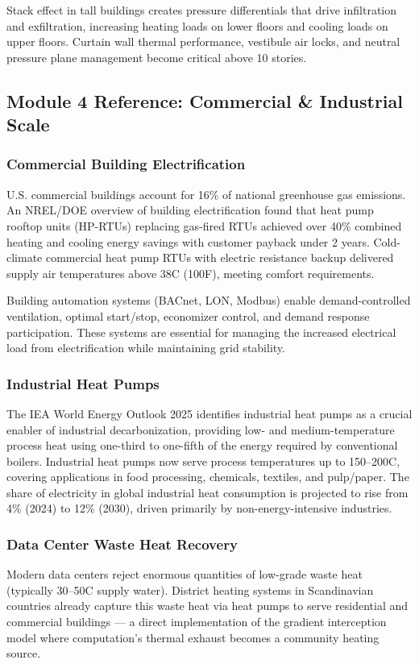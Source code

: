\documentclass[11pt,letterpaper]{article}
\begin{document}
Stack effect in tall buildings creates pressure differentials that drive infiltration and exfiltration, increasing heating loads on lower floors and cooling loads on upper floors. Curtain wall thermal performance, vestibule air locks, and neutral pressure plane management become critical above 10 stories.

\subsection{Module 4 Reference: Commercial \& Industrial Scale}

\subsubsection{Commercial Building Electrification}
U.S. commercial buildings account for 16\% of national greenhouse gas emissions. An NREL/DOE overview of building electrification found that heat pump rooftop units (HP-RTUs) replacing gas-fired RTUs achieved over 40\% combined heating and cooling energy savings with customer payback under 2 years. Cold-climate commercial heat pump RTUs with electric resistance backup delivered supply air temperatures above 38\textdegree C (100\textdegree F), meeting comfort requirements.

Building automation systems (BACnet, LON, Modbus) enable demand-controlled ventilation, optimal start/stop, economizer control, and demand response participation. These systems are essential for managing the increased electrical load from electrification while maintaining grid stability.

\subsubsection{Industrial Heat Pumps}
The IEA World Energy Outlook 2025 identifies industrial heat pumps as a crucial enabler of industrial decarbonization, providing low- and medium-temperature process heat using one-third to one-fifth of the energy required by conventional boilers. Industrial heat pumps now serve process temperatures up to 150--200\textdegree C, covering applications in food processing, chemicals, textiles, and pulp/paper. The share of electricity in global industrial heat consumption is projected to rise from 4\% (2024) to 12\% (2030), driven primarily by non-energy-intensive industries.

\subsubsection{Data Center Waste Heat Recovery}
Modern data centers reject enormous quantities of low-grade waste heat (typically 30--50\textdegree C supply water). District heating systems in Scandinavian countries already capture this waste heat via heat pumps to serve residential and commercial buildings --- a direct implementation of the gradient interception model where computation's thermal exhaust becomes a community heating source.
\end{document}
